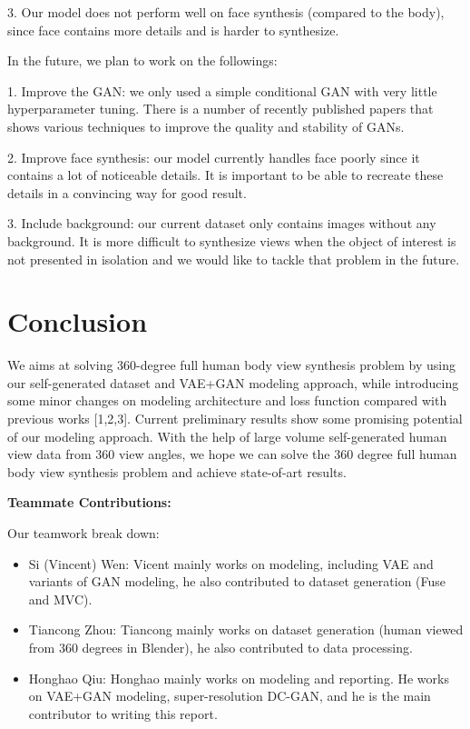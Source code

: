 \documentclass[10pt,conference]{IEEEtran}
\begin{document}
3. Our model does not perform well on face synthesis (compared to the body), since face contains more details and is harder to synthesize.

In the future, we plan to work on the followings:

1. Improve the GAN: we only used a simple conditional GAN with very little hyperparameter tuning. There is a number of recently published papers that shows various techniques to improve the quality and stability of GANs.

2. Improve face synthesis: our model currently handles face poorly since it contains a lot of noticeable details. It is important to be able to recreate these details in a convincing way for good result. 

3. Include background: our current dataset only contains images without any background. It is more difficult to synthesize views when the object of interest is not presented in isolation and we would like to tackle that problem in the future.


\section{Conclusion}
We aims at solving 360-degree full human body view synthesis problem by using our self-generated dataset and VAE+GAN modeling approach, while introducing some minor changes on modeling architecture and loss function compared with previous works [1,2,3].
Current preliminary results show some promising potential of our modeling approach. With the help of large volume self-generated human view data from 360 view angles, we hope we can solve the 360 degree full human body view synthesis problem and achieve state-of-art results.

\textbf{Teammate Contributions:}

Our teamwork break down:
\begin{itemize}
\item Si (Vincent) Wen: Vicent mainly works on modeling, including VAE and variants of GAN modeling, he also contributed to dataset generation (Fuse and MVC).
\item Tiancong Zhou: Tiancong mainly works on dataset generation (human viewed from 360 degrees in Blender), he also contributed to data processing.
\item Honghao Qiu: Honghao mainly works on modeling and reporting. He works on VAE+GAN modeling, super-resolution DC-GAN, and he is the main contributor to writing this report.
\end{itemize}
\end{document}
